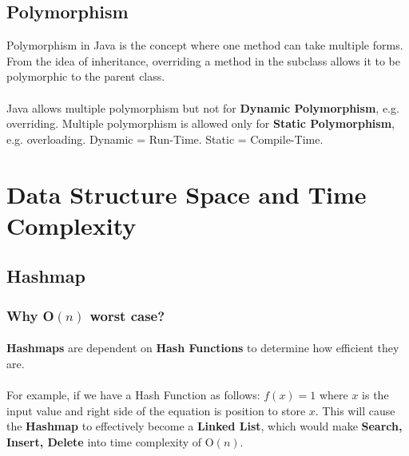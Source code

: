 \documentclass{article}
\begin{document}
	\subsection{Polymorphism}
	
		Polymorphism in Java is the concept where one method can take multiple forms. From the idea of inheritance, overriding a method in the subclass allows it to be polymorphic to the parent class.
		
		\paragraph{}
		
		Java allows multiple polymorphism but not for \textbf{Dynamic Polymorphism}, e.g. overriding. Multiple polymorphism is allowed only for \textbf{Static Polymorphism}, e.g. overloading. Dynamic = Run-Time. Static = Compile-Time. 

\section{Data Structure Space and Time Complexity}

\subsection{Hashmap}

\subsubsection{Why O\((n)\) worst case?}

\paragraph{}

	\textbf{Hashmaps} are dependent on \textbf{Hash Functions} to determine how efficient they are. 
	
\paragraph{}	
	
	For example, if we have a Hash Function as follows: \(f(x)=1\) where \(x\) is the input value and right side of the equation is position to store \(x\). This will cause the \textbf{Hashmap} to effectively become a \textbf{Linked List}, which would make \textbf{Search, Insert, Delete} into time complexity of O\((n)\).
\end{document}
